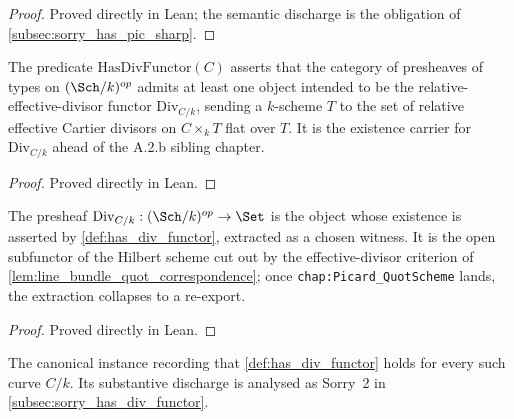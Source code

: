 \begin{proof}

\leanok
  Proved directly in Lean; the semantic discharge is the obligation of
  \cref{subsec:sorry_has_pic_sharp}.
\end{proof}

\begin{definition}
  \label{def:has_div_functor}
  The predicate \(\mathrm{HasDivFunctor}(C)\) asserts that the category of presheaves
  of types on \((\Sch/k)^{op}\) admits at least one object intended to be the
  relative-effective-divisor functor \(\mathrm{Div}_{C/k}\), sending a
  \(k\)-scheme \(T\) to the set of relative effective Cartier divisors on
  \(C \times_k T\) flat over \(T\). It is the existence carrier for
  \(\mathrm{Div}_{C/k}\) ahead of the A.2.b sibling chapter.
\end{definition}

\begin{proof}
  Proved directly in Lean.
\end{proof}

\begin{definition}
  \label{def:div_functor_carrier}
  The presheaf \(\mathrm{Div}_{C/k} : (\Sch/k)^{op} \to \Set\) is the object
  whose existence is asserted by \cref{def:has_div_functor}, extracted as a
  chosen witness. It is the open subfunctor of the Hilbert scheme cut out by
  the effective-divisor criterion of \cref{lem:line_bundle_quot_correspondence};
  once \texttt{chap:Picard\_QuotScheme} lands, the extraction collapses to a
  re-export.
\end{definition}

\begin{proof}
  Proved directly in Lean.
\end{proof}

\begin{definition}
  \label{def:inst_has_div_functor}
  The canonical instance recording that \cref{def:has_div_functor} holds for
  every such curve \(C/k\). Its substantive discharge is analysed as Sorry~2
  in \cref{subsec:sorry_has_div_functor}.
\end{definition}

